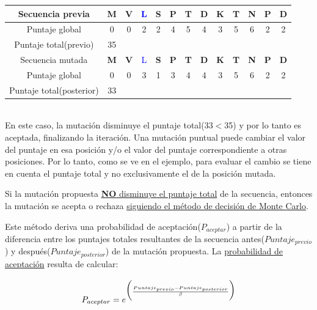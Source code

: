 \begin{enumerate}
\vspace{0.3cm}
       \begin{tabular}{ccccccccccccc}
       \hline
       
	Secuencia previa &  \textbf{M} & \textbf{V} & \textcolor{blue}{L} & \textbf{S} & \textbf{P} & \textbf{T} & \textbf{D} & \textbf{K} & \textbf{T} & \textbf{N} & \textbf{P} & \textbf{D}\\  \hline
	Puntaje global & 0 & 0 & 2 & 2 & 4 & 5 & 4 & 3 & 5 & 6 & 2 & 2\\  \hline
       Puntaje total(previo) & 35 \\ \hline \hline
       Secuencia mutada & \textbf{M} & \textbf{V} & \textcolor{blue}{L} & \textbf{S} & \textbf{P} & \textbf{T} & \textbf{D} & \textbf{K} & \textbf{T} & \textbf{N} & \textbf{P} & \textbf{D}\\  \hline
	Puntaje global  & 0 & 0 & 3 & 1 & 3 & 4 & 4 & 3 & 5 & 6 & 2 & 2\\  \hline
       Puntaje total(posterior) & 33 \\  \hline
      \end{tabular}\\
      
    En este caso, la mutación disminuye el puntaje total(33$<$35) y por lo tanto es aceptada, finalizando la iteración.
    Una mutación puntual puede cambiar el valor del puntaje en esa posición y/o el valor del puntaje correspondiente a otras posiciones. 
    Por lo tanto, como se ve en el ejemplo, para evaluar el cambio se tiene en cuenta el puntaje total y no exclusivamente el de la posición mutada. 
    
    
    Si la mutación propuesta \underline{\textbf{NO} disminuye el puntaje total} de la secuencia, entonces la mutación se acepta o rechaza \underline{siguiendo el método de decisión de Monte Carlo}. 
    
    Este método deriva una probabilidad de aceptación($P_{aceptar}$) a partir de la diferencia entre los puntajes totales resultantes de la secuencia antes($Puntaje_{previo}$) y después($Puntaje_{posterior}$) de la mutación propuesta.
    La \underline{probabilidad de aceptación} resulta de calcular:
  
 {
    \begin{equation}\label{monteCarlo}
    \Large
    P_{aceptar} =  e^{\Big(\frac{Puntaje_{previo}  - Puntaje_{posterior} } {\beta}\Big)} 
   \end{equation}
  }
    

\end{enumerate}
